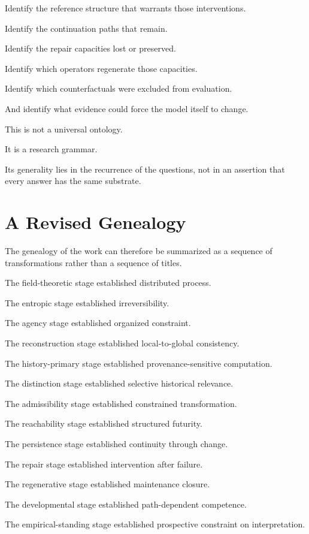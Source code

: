 \documentclass[11pt]{article}
\theoremstyle{remark}
\begin{document}
Identify the reference structure that warrants those interventions.

Identify the continuation paths that remain.

Identify the repair capacities lost or preserved.

Identify which operators regenerate those capacities.

Identify which counterfactuals were excluded from evaluation.

And identify what evidence could force the model itself to change.

This is not a universal ontology.

It is a research grammar.

Its generality lies in the recurrence of the questions, not in an assertion that every answer has the same substrate.

\section{A Revised Genealogy}

The genealogy of the work can therefore be summarized as a sequence of transformations rather than a sequence of titles.

The field-theoretic stage established distributed process.

The entropic stage established irreversibility.

The agency stage established organized constraint.

The reconstruction stage established local-to-global consistency.

The history-primary stage established provenance-sensitive computation.

The distinction stage established selective historical relevance.

The admissibility stage established constrained transformation.

The reachability stage established structured futurity.

The persistence stage established continuity through change.

The repair stage established intervention after failure.

The regenerative stage established maintenance closure.

The developmental stage established path-dependent competence.

The empirical-standing stage established prospective constraint on interpretation.
\end{document}
